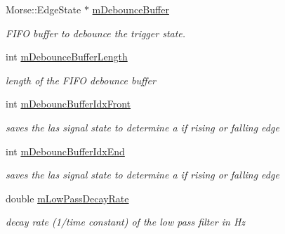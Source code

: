 \begin{DoxyCompactItemize}
\mbox{\label{classMorseDecode_a5320f2da57d9b182e67cf9efcefa5568}} 
Morse\+::\+Edge\+State $\ast$ \hyperlink{classMorseDecode_a5320f2da57d9b182e67cf9efcefa5568}{m\+Debounce\+Buffer}
\begin{DoxyCompactList}\small\item\em F\+I\+FO buffer to debounce the trigger state. \end{DoxyCompactList}\item 
\mbox{\label{classMorseDecode_ab7f82b40e054a0e858343cd63c7104e0}} 
int \hyperlink{classMorseDecode_ab7f82b40e054a0e858343cd63c7104e0}{m\+Debounce\+Buffer\+Length}
\begin{DoxyCompactList}\small\item\em length of the F\+I\+FO debounce buffer \end{DoxyCompactList}\item 
\mbox{\label{classMorseDecode_a4cbeac471ba8131720e2d5e30b9cfdec}} 
int \hyperlink{classMorseDecode_a4cbeac471ba8131720e2d5e30b9cfdec}{m\+Debounc\+Buffer\+Idx\+Front}
\begin{DoxyCompactList}\small\item\em saves the las signal state to determine a if rising or falling edge \end{DoxyCompactList}\item 
\mbox{\label{classMorseDecode_a07d5aff46940b30fc177435ad9f58084}} 
int \hyperlink{classMorseDecode_a07d5aff46940b30fc177435ad9f58084}{m\+Debounc\+Buffer\+Idx\+End}
\begin{DoxyCompactList}\small\item\em saves the las signal state to determine a if rising or falling edge \end{DoxyCompactList}\item 
\mbox{\label{classMorseDecode_ab1bce8b0b5f6e86546915564a115394e}} 
double \hyperlink{classMorseDecode_ab1bce8b0b5f6e86546915564a115394e}{m\+Low\+Pass\+Decay\+Rate}
\begin{DoxyCompactList}\small\item\em decay rate (1/time constant) of the low pass filter in Hz \end{DoxyCompactList}\item 
\mbox{\label{classMorseDecode_a863b8dfbb16d6017fa41ca4aba30e4e5}} 

\end{DoxyCompactItemize}
